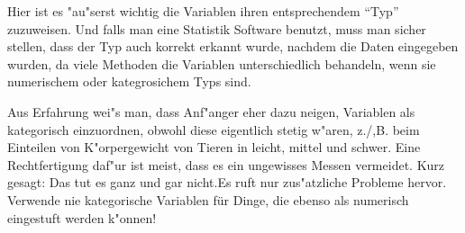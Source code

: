 \documentclass[a4paper,twoside]{tufte-book}\usepackage[]{graphicx}\usepackage[]{color}
\begin{document}
Hier ist es "au"serst wichtig die Variablen ihren entsprechendem ``Typ'' zuzuweisen. Und falls man eine Statistik Software benutzt, muss man sicher stellen, dass der Typ auch korrekt erkannt wurde, nachdem die Daten eingegeben wurden, da viele Methoden die Variablen unterschiedlich behandeln, wenn sie numerischem oder kategrosichem Typs sind.

Aus Erfahrung wei"s man, dass Anf"anger eher dazu neigen, Variablen als kategorisch einzuordnen, obwohl diese eigentlich stetig w"aren, z./,B. beim Einteilen von K"orpergewicht von Tieren in leicht, mittel und schwer. Eine Rechtfertigung daf"ur ist meist, dass es ein ungewisses Messen vermeidet. Kurz gesagt: Das tut es ganz und gar nicht.Es ruft nur zus"atzliche Probleme hervor. Verwende nie kategorische Variablen für Dinge, die ebenso als numerisch eingestuft werden k"onnen!
\end{document}
